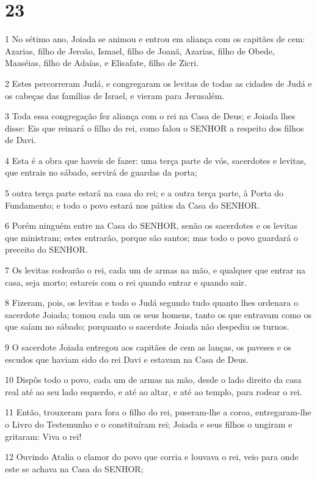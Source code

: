 \chapter{23}

\par 1 No sétimo ano, Joiada se animou e entrou em aliança com os capitães de cem: Azarias, filho de Jeroão, Ismael, filho de Joanã, Azarias, filho de Obede, Maaséias, filho de Adaías, e Elisafate, filho de Zicri.
\par 2 Estes percorreram Judá, e congregaram os levitas de todas as cidades de Judá e os cabeças das famílias de Israel, e vieram para Jerusalém.
\par 3 Toda essa congregação fez aliança com o rei na Casa de Deus; e Joiada lhes disse: Eis que reinará o filho do rei, como falou o SENHOR a respeito dos filhos de Davi.
\par 4 Esta é a obra que haveis de fazer: uma terça parte de vós, sacerdotes e levitas, que entrais no sábado, servirá de guardas da porta;
\par 5 outra terça parte estará na casa do rei; e a outra terça parte, à Porta do Fundamento; e todo o povo estará nos pátios da Casa do SENHOR.
\par 6 Porém ninguém entre na Casa do SENHOR, senão os sacerdotes e os levitas que ministram; estes entrarão, porque são santos; mas todo o povo guardará o preceito do SENHOR.
\par 7 Os levitas rodearão o rei, cada um de armas na mão, e qualquer que entrar na casa, seja morto; estareis com o rei quando entrar e quando sair.
\par 8 Fizeram, pois, os levitas e todo o Judá segundo tudo quanto lhes ordenara o sacerdote Joiada; tomou cada um os seus homens, tanto os que entravam como os que saíam no sábado; porquanto o sacerdote Joiada não despediu os turnos.
\par 9 O sacerdote Joiada entregou aos capitães de cem as lanças, os paveses e os escudos que haviam sido do rei Davi e estavam na Casa de Deus.
\par 10 Dispôs todo o povo, cada um de armas na mão, desde o lado direito da casa real até ao seu lado esquerdo, e até ao altar, e até ao templo, para rodear o rei.
\par 11 Então, trouxeram para fora o filho do rei, puseram-lhe a coroa, entregaram-lhe o Livro do Testemunho e o constituíram rei; Joiada e seus filhos o ungiram e gritaram: Viva o rei!
\par 12 Ouvindo Atalia o clamor do povo que corria e louvava o rei, veio para onde este se achava na Casa do SENHOR;
